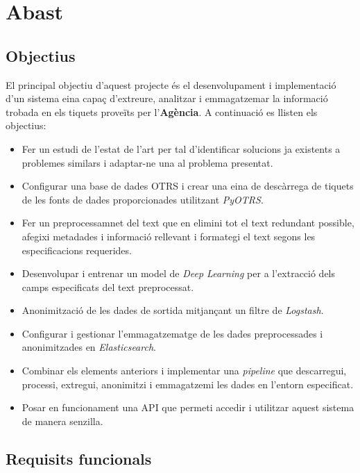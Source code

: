 \section{Abast}

\subsection{Objectius} \label{ssec:objectius}

El principal objectiu d'aquest projecte és el desenvolupament i implementació d'un sistema eina capaç d'extreure, analitzar i emmagatzemar la informació trobada en els tiquets proveïts per l'\textbf{Agència}. A continuació es llisten els objectius:

\begin{itemize}
    \item Fer un estudi de l'estat de l'art per tal d'identificar solucions ja existents a problemes similars i adaptar-ne una al problema presentat.
    \item Configurar una base de dades OTRS i crear una eina de descàrrega de tiquets de les fonts de dades proporcionades utilitzant \textit{PyOTRS}.
    \item Fer un preprocessamnet del text que en elimini tot el text redundant possible, afegixi metadades i informació rellevant i formategi el text segons les especificacions requerides.
    \item Desenvolupar i entrenar un model de \textit{Deep Learning} per a l'extracció dels camps especificats del text preprocessat.
    \item Anonimització de les dades de sortida mitjançant un filtre de \textit{Logstash}.
    \item Configurar i gestionar l'emmagatzematge de les dades preprocessades i anonimitzades en \textit{Elasticsearch}.
    \item Combinar els elements anteriors i implementar una \textit{pipeline} que descarregui, processi, extregui, anonimitzi i emmagatzemi les dades en l'entorn especificat.
    \item Posar en funcionament una API que permeti accedir i utilitzar aquest sistema de manera senzilla.
\end{itemize}


\subsection{Requisits funcionals}

